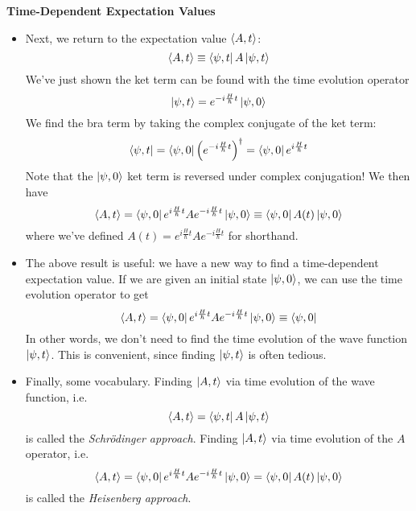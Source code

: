 \documentclass[11pt, a4paper]{article}
\newcommand{\schro}{Schr\"{o}dinger\xspace}
\newcommand{\tev}{e^{-i\frac{H}{\hbar}t}}  %
\newcommand{\tevp}{e^{i\frac{H}{\hbar}t}}  %
\begin{document}
\textbf{Time-Dependent Expectation Values}
\begin{itemize}
	
	\item Next, we return to the expectation value $ \ev{A, t} $:
	\begin{equation*}
		\ev{A, t} \equiv \bra{\psi, t} A \ket{\psi, t}
	\end{equation*}
	We've just shown the ket term can be found with the time evolution operator
	\begin{equation*}
		\ket{\psi, t} = \tev \ket{\psi, 0}
	\end{equation*}
	We find the bra term by taking the complex conjugate of the ket term:
	\begin{equation*}
		\bra{\psi, t} = \bra{\psi, 0}\left(\tev\right)^{\dagger} = \bra{\psi, 0}\tevp
	\end{equation*}
	Note that the $ \ket{\psi, 0} $ ket term is reversed under complex conjugation! We then have
	\begin{equation*}
		\ev{A, t} = \bra{\psi, 0}\tevp A \tev \ket{\psi, 0} \equiv  \bra{\psi, 0} A(t) \ket{\psi, 0}
	\end{equation*}
	where we've defined $ A(t) = \tevp A \tev  $ for shorthand.
	
	\item The above result is useful: we have a new way to find a time-dependent expectation value. If we are given an initial state $ \ket{\psi, 0} $, we can use the time evolution operator to get
	\begin{equation*}
		\ev{A, t} = \bra{\psi, 0}\tevp A \tev \ket{\psi, 0} \equiv  \bra{\psi, 0}
	\end{equation*}
	In other words, we don't need to find the time evolution of the wave function $ \ket{\psi, t} $. This is convenient, since finding $ \ket{\psi, t} $ is often tedious.
	
	\item Finally, some vocabulary. Finding $ \ket{A, t} $ via time evolution of the wave function, i.e. 
	\begin{equation*}
		\ev{A, t} = \bra{\psi, t} A \ket{\psi, t}
	\end{equation*}
	is called the \textit{\schro approach}. Finding $ \ket{A, t} $ via time evolution of the $ A $ operator, i.e. 
	\begin{equation*}
		\ev{A, t} = \bra{\psi, 0}\tevp A \tev \ket{\psi, 0} = \bra{\psi, 0} A(t) \ket{\psi, 0}
	\end{equation*}
	is called the \textit{Heisenberg approach}. 
\end{itemize}
\end{document}

